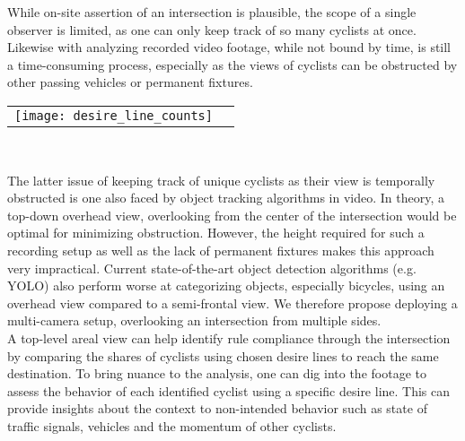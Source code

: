  While on-site assertion of an intersection is plausible, the scope of a single observer is limited, as one can only keep track of 
 so many cyclists at once. Likewise with analyzing recorded video footage, while not bound by time, is still a time-consuming process, 
 especially as the views of cyclists can be obstructed by other passing vehicles or permanent fixtures.
\ \\

\raggedbottom
\noindent
\begin{tabular}{@{}cc}
\texttt{[image: desire\_line\_counts]} 
\end{tabular}
\

The latter issue of keeping track of unique cyclists as their view is temporally obstructed is one also faced by 
object tracking algorithms in video. In theory, a top-down overhead view, overlooking from the center of the intersection would be optimal for minimizing obstruction.
However, the height required for such a recording setup as well as the lack of permanent fixtures makes this approach very impractical. 
Current state-of-the-art object detection algorithms (e.g. YOLO) also perform worse at categorizing objects, especially bicycles, 
using an overhead view compared to a semi-frontal view. We therefore propose deploying a multi-camera setup, overlooking an intersection from
multiple sides.
\ \\

A top-level areal view can help identify rule compliance through the intersection by comparing
the shares of cyclists using chosen desire lines to reach the same destination. 
To bring nuance to the analysis, one can dig into the footage to assess the behavior of 
each identified cyclist using a specific desire line. 
This can provide insights about the context to non-intended behavior such as state of traffic signals, 
vehicles and the momentum of other cyclists.